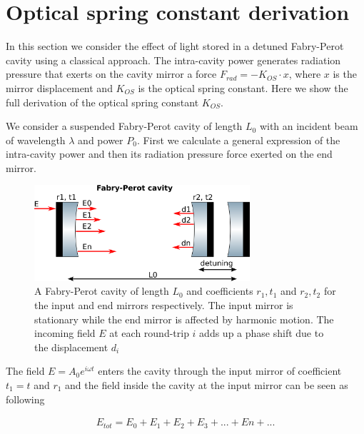 \section{Optical spring constant derivation}
\label{app:A} 

In this section we consider the effect of light stored in a detuned Fabry-Perot cavity using a classical approach.
The intra-cavity power generates radiation pressure that exerts on the cavity mirror a force $F_{rad}=-K_{OS}\cdot x$,
where $x$ is the mirror displacement and $K_{OS}$ is the optical spring constant.
Here we show the full derivation of the optical spring constant $K_{OS}$.

We consider a suspended Fabry-Perot cavity of length $L_0$ %
with an incident beam of wavelength $\lambda$ and power $P_0$.
First we calculate a general expression of the intra-cavity power and then its  radiation pressure force exerted on the end mirror.\\


\begin{figure}[htbp]
	\centering
		\includegraphics[width=8cm]{./figures/cavity_paper.pdf}
	\caption[Derivation of Optomechanical Cavity Dynamics]{
        A Fabry-Perot cavity of length $L_0$ and coefficients $r_1,t_1$ and $r_2,t_2$ for the input and end mirrors respectively. 
	The input mirror is stationary while the end mirror is affected by harmonic motion. The incoming field $E$ at each round-trip $i$ adds up a phase shift due to the displacement $d_i$}
	\label{fig:cavity_k}
\end{figure}


The field $E=A_0e^{i\omega t}$ enters the cavity through the input mirror of coefficient $t_1=t$ and $r_1$ and the field inside the cavity at the input mirror can be seen as following

\begin{eqnarray}
E_{tot}=E_0+E_1+E_2+E_3+...+En+...
\end{eqnarray}


